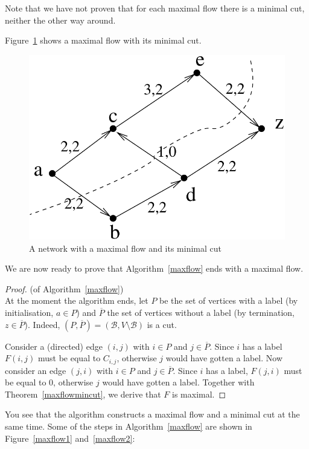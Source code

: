 Note that we have not proven that for each maximal flow there is a
minimal cut, neither the other way around.

Figure~\ref{snede2} shows a maximal flow with its minimal cut.

\begin{figure}[ht]
	\centering
	\includegraphics[width=0.35\linewidth,keepaspectratio]{snede2} %
	\caption{A network with a maximal flow and its minimal cut\label{snede2}}
\end{figure}

We are now ready to prove that Algorithm~\ref{maxflow} ends with a
maximal flow.

\begin{proof} (of Algorithm~\ref{maxflow})\\
At the moment the algorithm ends, let $P$ be the set of vertices with
a label (by initialisation, $a \in P$) and $\overline{P}$ the set of vertices
without a label (by termination, $z \in \overline{P}$). Indeed, $(P,\overline{P}) = (\mathcal{B}, V\setminus \mathcal{B})$ is a cut.

Consider a (directed) edge $(i,j)$ with $i \in P$ and $j \in
\overline{P}$.  Since $i$ has a label $F(i,j)$ must be equal to
$C_{i,j}$, otherwise $j$ would have gotten a label. Now consider an
edge $(j,i)$ with $i \in P$ and $j \in \overline{P}$. Since $i$ has a
label, $F(j,i)$ must be equal to 0, otherwise $j$ would have gotten a
label. Together with Theorem~\ref{maxflowmincut}, we derive that $F$
is maximal.
\end{proof}

You see that the algorithm constructs a maximal flow
and a minimal cut at the same time. Some of the steps in Algorithm~\ref{maxflow} are
shown in Figure~\ref{maxflow1} and~\ref{maxflow2}:

